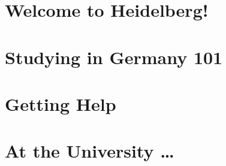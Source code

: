 \documentclass[ngerman,a4paper,openany,twocolumn,showtrims]{memoir}
\begin{document}
\pagestyle{empty}

\frontmatter

\tableofcontents

\mainmatter
\pagestyle{plain}
\renewcommand*{\chaptermark}[1]{%
    \markboth{%
        \textcolor{sectiontextfarbe}{%
            \sffamily\bfseries\textsc{#1}%
        }%
    }{}%
}
\renewcommand*{\sectionmark}[1]{%
    \markright{%
        \textcolor{sectiontextfarbe}{%
            \sffamily\bfseries\textsc{#1}%
        }%
    }%
}

\chapter{Welcome to Heidelberg!}
% 

% 
% 
% 
% 
% 
% 

\chapter{Studying in Germany 101}
% 
% 
% 

\chapter{Getting Help}
% 
% 
% 
% 
% 

\chapter{At the University \dots}
% 
% 
% 
% 
\end{document}
